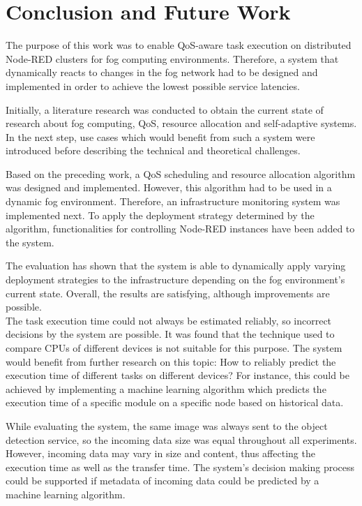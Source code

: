 \clearpage
\chapter{Conclusion and Future Work}

The purpose of this work was to enable QoS-aware task execution on distributed Node-RED clusters for fog computing environments.
Therefore, a system that dynamically reacts to changes in the fog network had to be designed and implemented in order to achieve the lowest possible service latencies.

Initially, a literature research was conducted to obtain the current state of research about fog computing, QoS, resource allocation and self-adaptive systems.
In the next step, use cases which would benefit from such a system were introduced before describing the technical and theoretical challenges.

Based on the preceding work, a QoS scheduling and resource allocation algorithm was designed and implemented.
However, this algorithm had to be used in a dynamic fog environment.
Therefore, an infrastructure monitoring system was implemented next.
To apply the deployment strategy determined by the algorithm, functionalities for controlling Node-RED instances have been added to the system.

The evaluation has shown that the system is able to dynamically apply varying deployment strategies to the infrastructure depending on the fog environment's current state.
Overall, the results are satisfying, although improvements are possible.\\


The task execution time could not always be estimated reliably, so incorrect decisions by the system are possible.
It was found that the technique used to compare CPUs of different devices is not suitable for this purpose.
The system would benefit from further research on this topic:
How to reliably predict the execution time of different tasks on different devices?
For instance, this could be achieved by implementing a machine learning algorithm which predicts the execution time of a specific module on a specific node based on historical data.

While evaluating the system, the same image was always sent to the object detection service, so the incoming data size was equal throughout all experiments.
However, incoming data may vary in size and content, thus affecting the execution time as well as the transfer time.
The system’s decision making process could be supported if metadata of incoming data could be predicted by a machine learning algorithm.


